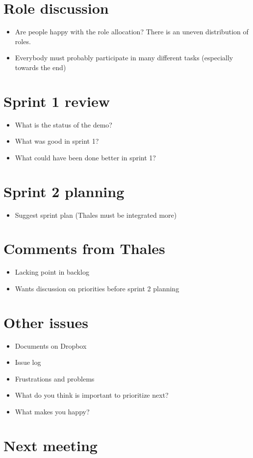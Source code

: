 \documentclass[a4paper,12pt]{article}
\begin{document}
\section{Role discussion}
\begin{itemize}
\item
Are people happy with the role allocation? There is an uneven distribution of roles. 
\item
Everybody must probably participate in many different tasks (especially towards the end)
\end{itemize}
\section{Sprint 1 review}
\begin{itemize}
\item
What is the status of the demo?
\item
What was good in sprint 1?
\item
What could have been done better in sprint 1?
\end{itemize}
\section{Sprint 2 planning}
\begin{itemize}
\item
Suggest sprint plan (Thales must be integrated more)
\end{itemize}
\section{Comments from Thales}
\begin{itemize}
\item
Lacking point in backlog
\item
Wants discussion on priorities before sprint 2 planning
\end{itemize}
\section{Other issues}
\begin{itemize}
\item
Documents on Dropbox
\item
Issue log
\item
Frustrations and problems
\item
What do you think is important to prioritize next?
\item
What makes you happy?
\end{itemize}
\section{Next meeting}
\end{document}

